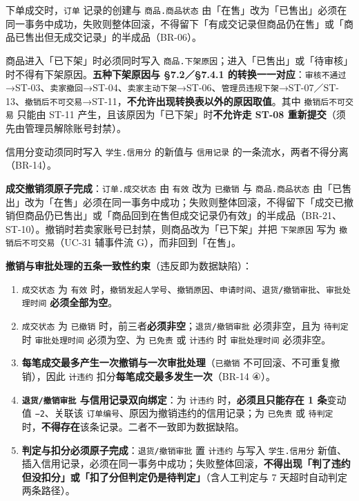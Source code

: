 \documentclass[12pt,a4paper]{ctexart}
\begin{document}
下单成交时，\texttt{订单} 记录的创建与 \texttt{商品.商品状态} 由「在售」改为「已售出」必须在同一事务中成功，失败则整体回滚，不得留下「有成交记录但商品仍在售」或「商品已售出但无成交记录」的半成品（BR-06）。


商品进入「已下架」时必须同时写入 \texttt{商品.下架原因}；进入「已售出」或「待审核」时不得有下架原因。\textbf{五种下架原因与 §7.2／§7.4.1 的转换一一对应}：\texttt{审核不通过}→ST-03、\texttt{卖家撤回}→ST-04、\texttt{卖家主动下架}→ST-06、\texttt{管理员违规下架}→ST-07／ST-13、\texttt{撤销后不可交易}→ST-11，\textbf{不允许出现转换表以外的原因取值}。其中 \texttt{撤销后不可交易} 只能由 ST-11 产生，且该原因为「已下架」时\textbf{不允许走 ST-08 重新提交}（须先由管理员解除账号封禁）。


信用分变动须同时写入 \texttt{学生.信用分} 的新值与 \texttt{信用记录} 的一条流水，两者不得分离（BR-14）。


\textbf{成交撤销须原子完成}：\texttt{订单.成交状态} 由 \texttt{有效} 改为 \texttt{已撤销} 与 \texttt{商品.商品状态} 由「已售出」改为「在售」必须在同一事务中成功；失败则整体回滚，不得留下「成交已撤销但商品仍已售出」或「商品回到在售但成交记录仍有效」的半成品（BR-21、ST-10）。撤销时若卖家账号已封禁，则商品改为「已下架」并把 \texttt{下架原因} 写为 \texttt{撤销后不可交易}（UC-31 辅事件流 G），而非回到「在售」。


\textbf{撤销与审批处理的五条一致性约束}（违反即为数据缺陷）：

\begin{enumerate}[leftmargin=1.9em,itemsep=1pt,topsep=2pt]
\item \texttt{成交状态} 为 \texttt{有效} 时，\texttt{撤销发起人学号}、\texttt{撤销原因}、\texttt{申请时间}、\texttt{退货/撤销审批}、\texttt{审批处理时间} \textbf{必须全部为空}。
\item \texttt{成交状态} 为 \texttt{已撤销} 时，前三者\textbf{必须非空}；\texttt{退货/撤销审批} 必须非空，且为 \texttt{待判定} 时 \texttt{审批处理时间} 必须为空、为 \texttt{已免责} 或 \texttt{计违约} 时 \texttt{审批处理时间} 必须非空。
\item \textbf{每笔成交最多产生一次撤销与一次审批处理}（\texttt{已撤销} 不可回滚、不可重复撤销），因此 \texttt{计违约} 扣分\textbf{每笔成交最多发生一次}（BR-14 ④）。
\item \textbf{\texttt{退货/撤销审批} 与信用记录双向绑定}：为 \texttt{计违约} 时，\textbf{必须且只能存在 1 条}变动值 \texttt{−2}、关联该 \texttt{订单编号}、原因为撤销违约的信用记录；为 \texttt{已免责} 或 \texttt{待判定} 时，\textbf{不得存在}该条记录。二者不一致即为数据缺陷。
\item \textbf{判定与扣分必须原子完成}：\texttt{退货/撤销审批} 置 \texttt{计违约} 与写入 \texttt{学生.信用分} 新值、插入信用记录，必须在同一事务中成功；失败整体回滚，\textbf{不得出现「判了违约但没扣分」或「扣了分但判定仍是待判定」}（含人工判定与 7 天超时自动判定两条路径）。
\end{enumerate}
\end{document}
